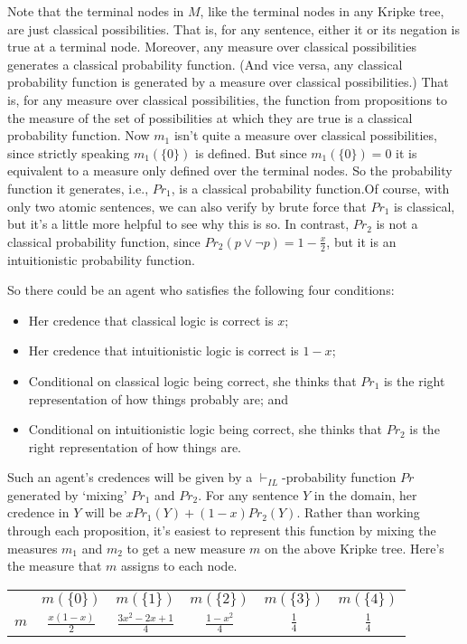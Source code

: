 Note that the terminal nodes in $M$, like the terminal nodes in any Kripke tree, are just classical possibilities. That is, for any sentence, either it or its negation is true at a terminal node. Moreover, any measure over classical possibilities generates a classical probability function. (And vice versa, any classical probability function is generated by a measure over classical possibilities.) That is, for any measure over classical possibilities, the function from propositions to the measure of the set of possibilities at which they are true is a classical probability function. Now $m_1$ isn't quite a measure over classical possibilities, since strictly speaking $m_1(\{0\})$ is defined. But since $m_1(\{0\}) = 0$ it is equivalent to a measure only defined over the terminal nodes. So the probability function it generates, i.e., $Pr_1$, is a classical probability function.Of course, with only two atomic sentences, we can also verify by brute force that $Pr_1$ is classical, but it's a little more helpful to see why this is so. In contrast, $Pr_2$ is not a classical probability function, since $Pr_2(p \vee \neg p) = 1 - \frac{x}{2}$, but it is an intuitionistic probability function.

So there could be an agent who satisfies the following four conditions:

\begin{itemize}
\item Her credence that classical logic is correct is $x$;
\item Her credence that intuitionistic logic is correct is $1-x$;
\item Conditional on classical logic being correct, she thinks that $Pr_1$ is the right representation of how things probably are; and
\item Conditional on intuitionistic logic being correct, she thinks that $Pr_2$ is the right representation of how things are.
\end{itemize}

\noindent Such an agent's credences will be given by a $\vdash_{IL}$-probability function $Pr$ generated by `mixing' $Pr_1$ and $Pr_2$. For any sentence $Y$ in the domain, her credence in $Y$ will be $xPr_1(Y) + (1-x)Pr_2(Y)$. Rather than working through each proposition, it's easiest to represent this function by mixing the measures $m_1$ and $m_2$ to get a new measure $m$ on the above Kripke tree. Here's the measure that $m$ assigns to each node.

\begin{center}
\begin{tabular}{r c c c c c}
 & $m(\{0\})$ & $m(\{1\})$ & $m(\{2\})$ & $m(\{3\})$ & $m(\{4\})$ \smallskip \\ 
$m$ & 
$\frac{x(1-x)}{2}$ &
$\frac{3x^2 - 2x + 1}{4}$ &
$\frac{1-x^2}{4}$ &
$\frac{1}{4}$ &
$\frac{1}{4}$
\end{tabular}
\end{center}

